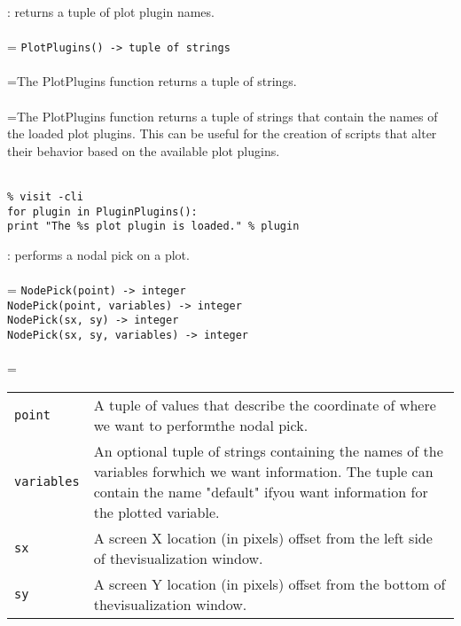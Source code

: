 \documentclass[10pt,a4paper]{report}
\begin{document}
{}
: returns a tuple of plot plugin names.\\[-3mm]

 \\ 
\hangindent=\parindent 
\verb!PlotPlugins() -> tuple of strings!\\ [-3mm]

 \\ 
\hangindent=\parindent The PlotPlugins function returns a tuple of strings. \\[-3mm] 

 \\ 
\hangindent=\parindent The PlotPlugins function returns a tuple of strings that contain the names of the loaded plot plugins. This can be useful for the creation of scripts that alter their behavior based on the available plot plugins. \\[-3mm] 

\\[-6mm]
\begin{verbatim}% visit -cli
for plugin in PluginPlugins():
print "The %s plot plugin is loaded." % plugin
\end{verbatim}
\newpage


{}
: performs a nodal pick on a plot.\\[-3mm]

 \\ 
\hangindent=\parindent 
\verb!NodePick(point) -> integer!\\ 
\verb!NodePick(point, variables) -> integer!\\ 
\verb!NodePick(sx, sy) -> integer!\\ 
\verb!NodePick(sx, sy, variables) -> integer!\\ [-3mm]

 \\ 
\hangindent=\parindent 
\begin{tabular}{lp{9cm}}
\verb!point! & A tuple of values that describe the coordinate of where we want to performthe nodal pick. \\
\verb!variables! & An optional tuple of strings containing the names of the variables forwhich we want information. The tuple can contain the name "default" ifyou want information for the plotted variable. \\
\verb!sx! & A screen X location (in pixels) offset from the left side of thevisualization window. \\
\verb!sy! & A screen Y location (in pixels) offset from the bottom of thevisualization window. \\
\end{tabular} \\[-2mm]
\end{document}
